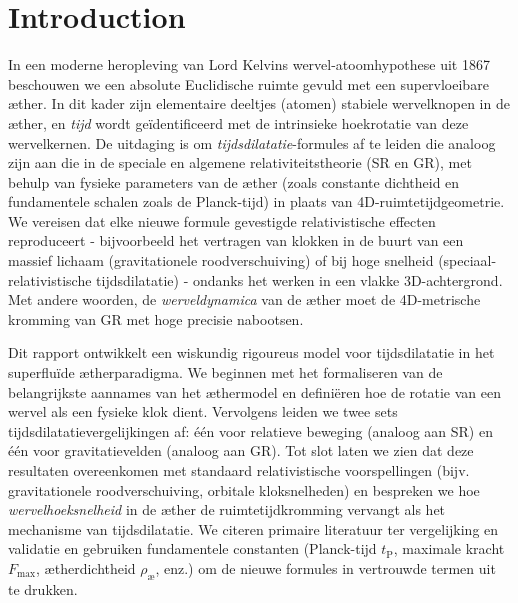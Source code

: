 
\section{Introduction}
In een moderne heropleving van Lord Kelvins wervel-atoomhypothese uit 1867~\cite{Kelvin1867-vortex} beschouwen we een absolute Euclidische ruimte gevuld met een supervloeibare æther. In dit kader zijn elementaire deeltjes (atomen) stabiele wervelknopen in de æther, en \emph{tijd} wordt geïdentificeerd met de intrinsieke hoekrotatie van deze wervelkernen. De uitdaging is om \emph{tijdsdilatatie}-formules af te leiden die analoog zijn aan die in de speciale en algemene relativiteitstheorie (SR en GR), met behulp van fysieke parameters van de æther (zoals constante dichtheid en fundamentele schalen zoals de Planck-tijd) in plaats van 4D-ruimtetijdgeometrie. We vereisen dat elke nieuwe formule gevestigde relativistische effecten reproduceert - bijvoorbeeld het vertragen van klokken in de buurt van een massief lichaam (gravitationele roodverschuiving) of bij hoge snelheid (speciaal-relativistische tijdsdilatatie) - ondanks het werken in een vlakke 3D-achtergrond. Met andere woorden, de \emph{werveldynamica} van de æther moet de 4D-metrische kromming van GR met hoge precisie nabootsen.

Dit rapport ontwikkelt een wiskundig rigoureus model voor tijdsdilatatie in het superfluïde ætherparadigma. We beginnen met het formaliseren van
de belangrijkste aannames van het æthermodel en definiëren hoe de rotatie van een wervel als een fysieke klok dient. Vervolgens leiden we twee
sets tijdsdilatatievergelijkingen af: één voor relatieve beweging (analoog aan SR) en één voor gravitatievelden (analoog aan GR). Tot slot laten we zien dat deze resultaten overeenkomen met standaard relativistische voorspellingen (bijv. gravitationele roodverschuiving, orbitale kloksnelheden) en bespreken we hoe \emph{wervelhoeksnelheid} in de æther de ruimtetijdkromming vervangt als het mechanisme van tijdsdilatatie. We citeren primaire literatuur ter vergelijking en validatie en gebruiken fundamentele constanten (Planck-tijd $t_\textrm{P}$, maximale kracht $F_{\max}$, ætherdichtheid $\rho_{\text{\ae}}$, enz.) om de nieuwe formules in vertrouwde termen uit te drukken.